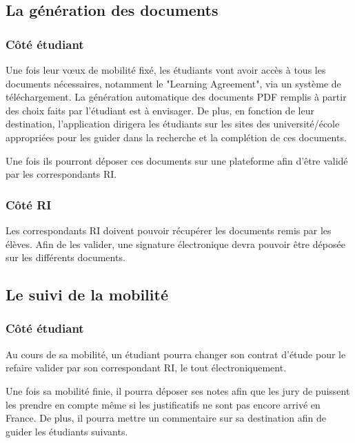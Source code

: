 		\subsection{La génération des documents}
		
		\subsubsection{Côté étudiant}
		
		Une fois leur vœux de mobilité fixé, les étudiants vont avoir accès à tous les documents nécessaires, notamment le "Learning Agreement", via un système de téléchargement. La génération automatique des documents PDF remplis à partir des choix faits par l'étudiant est à envisager. De plus, en fonction de leur destination, l'application dirigera les étudiants sur les sites des université/école appropriées pour les guider dans la recherche et la complétion de ces documents.
		
		Une fois ils pourront déposer ces documents sur une plateforme afin d'être validé par les correspondants RI.
	
		\subsubsection{Côté RI}
		
		Les correspondants RI doivent pouvoir récupérer les documents remis par les élèves. Afin de les valider, une signature électronique devra pouvoir être déposée sur les différents documents. 
		
		
		\subsection{Le suivi de la mobilité}
		
		\subsubsection{Côté étudiant}
		
		Au cours de sa mobilité, un étudiant pourra changer son contrat d'étude pour le refaire valider par son correspondant RI, le tout électroniquement.
		
		Une fois sa mobilité finie, il pourra déposer ses notes afin que les jury de puissent les prendre en compte même si les justificatifs ne sont pas encore arrivé en France. De plus, il pourra mettre un commentaire sur sa destination afin de guider les étudiants suivants.
		
